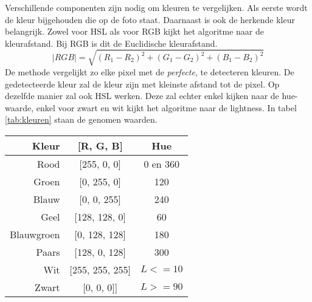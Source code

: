 Verschillende componenten zijn nodig om kleuren te vergelijken. Als eerste wordt de kleur bijgehouden die op de foto staat. Daarnaast is ook de herkende kleur belangrijk. Zowel voor HSL als voor RGB kijkt het algoritme naar de kleurafstand. Bij RGB is dit de Euclidische kleurafstand. 
$$ \mid RGB \mid = \sqrt{(R_1 - R_2)^2 + (G_1 - G_2)^2 + (B_1 - B_2)^2}$$
De methode vergelijkt zo elke pixel met de {\it perfecte}, te detecteren kleuren. De gedetecteerde kleur zal de kleur zijn met kleinste afstand tot de pixel. Op dezelfde manier zal ook HSL werken. Deze zal echter enkel kijken naar de hue-waarde, enkel voor zwart en wit kijkt het algoritme naar de lightness. In tabel \ref{tab:kleuren}  staan de genomen waarden.


\begin{tabular}{ | r | c | c | }
\hline
Kleur & [R, G, B] & Hue \\
\hline
Rood & [255, 0, 0] & 0 en 360 \\
Groen & [0, 255, 0] & 120 \\
Blauw & [0, 0, 255] & 240 \\
Geel & [128, 128, 0] & 60 \\
Blauwgroen & [0, 128, 128] & 180 \\
Paars & [128, 0, 128] & 300 \\
Wit & [255, 255, 255] & $L <= 10$ \\
Zwart & [0, 0, 0]] & $L >= 90$ \\
\hline
\end{tabular}